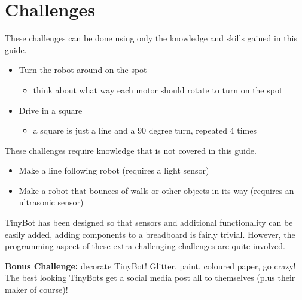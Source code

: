 \documentclass[a4paper,12pt]{article}
\begin{document}


\pagebreak


\pagebreak
\section{Challenges} \label{sec:challenges}

These challenges can be done using only the knowledge and skills gained in this guide. 
\begin{itemize}
    \item Turn the robot around on the spot
    \begin{itemize}
      \item think about what way each motor should rotate to turn on the spot
    \end{itemize} 
    \item Drive in a square 
    \begin{itemize}
      \item a square is just a line and a 90 degree turn, repeated 4 times
    \end{itemize}
\end{itemize}

\bigskip


These challenges require knowledge that is not covered in this guide.
\begin{itemize}
    \item Make a line following robot (requires a light sensor)
    \item Make a robot that bounces of walls or other objects in its way (requires an ultrasonic sensor)
\end{itemize}
TinyBot has been designed so that sensors and additional functionality can be easily added, adding components to a breadboard is fairly trivial. However, the programming aspect of these extra challenging challenges are quite involved.

\bigskip

\textbf{Bonus Challenge:} decorate TinyBot! Glitter, paint, coloured paper, go crazy! The best looking TinyBots get a social media post all to themselves (plus their maker of course)!

\appendix
% 
\end{document}
